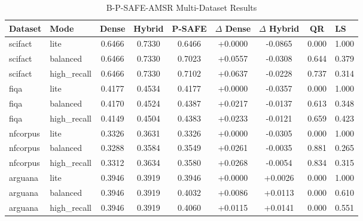 \begin{table}[t]
\centering
\caption{B-P-SAFE-AMSR Multi-Dataset Results}
\begin{tabular}{llccccccl}
\toprule
Dataset & Mode & Dense & Hybrid & P-SAFE & $\Delta$ Dense & $\Delta$ Hybrid & QR & LS \\
\midrule
scifact & lite & 0.6466 & 0.7330 & 0.6466 & +0.0000 & -0.0865 & 0.000 & 1.000 \\
scifact & balanced & 0.6466 & 0.7330 & 0.7023 & +0.0557 & -0.0308 & 0.644 & 0.379 \\
scifact & high_recall & 0.6466 & 0.7330 & 0.7102 & +0.0637 & -0.0228 & 0.737 & 0.314 \\
fiqa & lite & 0.4177 & 0.4534 & 0.4177 & +0.0000 & -0.0357 & 0.000 & 1.000 \\
fiqa & balanced & 0.4170 & 0.4524 & 0.4387 & +0.0217 & -0.0137 & 0.613 & 0.348 \\
fiqa & high_recall & 0.4149 & 0.4504 & 0.4383 & +0.0233 & -0.0121 & 0.659 & 0.423 \\
nfcorpus & lite & 0.3326 & 0.3631 & 0.3326 & +0.0000 & -0.0305 & 0.000 & 1.000 \\
nfcorpus & balanced & 0.3288 & 0.3584 & 0.3549 & +0.0261 & -0.0035 & 0.881 & 0.265 \\
nfcorpus & high_recall & 0.3312 & 0.3634 & 0.3580 & +0.0268 & -0.0054 & 0.834 & 0.315 \\
arguana & lite & 0.3946 & 0.3919 & 0.3946 & +0.0000 & +0.0026 & 0.000 & 1.000 \\
arguana & balanced & 0.3946 & 0.3919 & 0.4032 & +0.0086 & +0.0113 & 0.000 & 0.610 \\
arguana & high_recall & 0.3946 & 0.3919 & 0.4060 & +0.0115 & +0.0141 & 0.000 & 0.551 \\
\bottomrule
\end{tabular}
\end{table}
